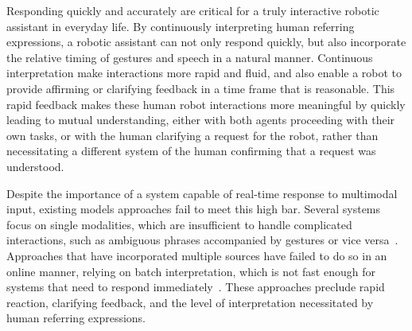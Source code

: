 \documentclass[a4paper, 11pt]{article} %
\begin{document}
Responding quickly and accurately are critical for a truly interactive robotic assistant in everyday life. By continuously interpreting human referring expressions, a robotic assistant can not only respond quickly, but also incorporate the relative timing of gestures and speech in a natural manner. Continuous interpretation make interactions more rapid and fluid, and also enable a robot to provide affirming or clarifying feedback in a time frame that is reasonable. This rapid feedback makes these human robot interactions more meaningful by quickly leading to mutual understanding, either with both agents proceeding with their own tasks, or with the human clarifying a request for the robot, rather than necessitating a different system of the human confirming that a request was understood.

Despite the importance of a system capable of real-time response to multimodal input, existing models approaches fail to meet this high bar. Several systems focus on single modalities, which are insufficient to handle complicated interactions, such as ambiguous phrases accompanied by gestures or vice versa~\citep{tellex11, kollar10}. Approaches that have incorporated multiple sources have failed to do so in an online manner, relying on batch interpretation, which is not fast enough for systems that need to respond immediately~\citep{matuszek14}. These approaches preclude rapid reaction, clarifying feedback, and the level of interpretation necessitated by human referring expressions.
\end{document}
